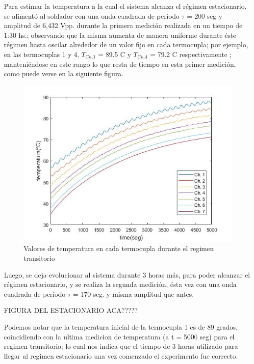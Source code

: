 \documentclass[twoside,twocolumn,a4paper]{article}
\begin{document}
Para estimar la temperatura a la cual el sistema alcanza el r\'egimen estacionario, se aliment\'o al soldador con una onda cuadrada de per\'iodo $\tau$ = 200 seg y amplitud de 6,432 Vpp. durante la primera medici\'on realizada en un tiempo de 1:30 hs.; observando que la misma aumenta de manera uniforme durante \'este r\'egimen hasta oscilar alrededor de un valor fijo en cada termocupla; por ejemplo, en las termocuplas 1 y 4, $T_{Ch. 1}$ = 89.5 C y $T_{Ch. 4}$ = 79.2 C respectivamente ; manteni\'endose en este rango lo que resta de tiempo en esta primer medici\'on, como puede verse en la siguiente figura.

\begin{figure}[H]
\includegraphics[width=\linewidth]{Tvst_transitorio.jpg}
\caption{Valores de temperatura en cada termocupla durante el regimen transitorio}
\label{fig:Tvst_transitorio}
\end{figure}


Luego, se deja evolucionar al sistema durante 3 horas m\'as, para poder alcanzar el r\'egimen estacionario, y se realiza la segunda medici\'on, \'esta vez con una onda cuadrada de per\'iodo $\tau$ = 170 seg. y misma amplitud que antes.

FIGURA DEL ESTACIONARIO ACA?????

Podemos notar que la temperatura inicial de la termocupla 1 es de 89 grados, coincidiendo con la ultima medicion de temperatura (a t = 5000 seg) para el regimen transitorio; lo cual nos indica que el tiempo de 3 horas utilizado para llegar al regimen estacionario una vez comenzado el experimento fue correcto.
\end{document}
